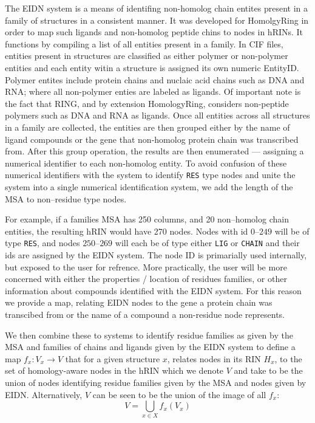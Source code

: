 The EIDN system is a means of identifing non-homolog chain entites present in a family of structures in a consistent manner. It was developed for HomolgyRing in order to map such ligands and non-homolog peptide chins to nodes in hRINs. 
It functions by compiling a list of all entities present in a family. In CIF files, entities present in structures are classified as either polymer or non-polymer entities and each entity witin a structure is assigned its own numeric EntityID. Polymer entites include protein chains and nuclaic acid chains such as DNA and RNA; where all non-polymer enties are labeled as ligands. Of important note is the fact that RING, and by extension HomologyRing, considers non-peptide polymers such as DNA and RNA as ligands. 
Once all entities across all structures in a family are collected, the entities are then grouped either by the name of ligand compounds or the gene that non-homolog protein chain was transcribed from. After this group operation, the results are then enumerated --- assigning a numerical identifier to each non-homolog entity. To avoid confusion of these numerical identifiers with the system to identify \texttt{RES} type nodes and unite the system into a single numerical identification system, we add the length of the MSA to non--residue type nodes. 

For example, if a families MSA has 250 columns, and 20 non--homolog chain entities, the resulting hRIN would have 270 nodes. Nodes with id $0$--$249$ will be of type \texttt{RES}, and nodes $250$--$269$ will each be of type either \texttt{LIG} or \texttt{CHAIN} and their ids are assigned by the EIDN system. 
The node ID is primarially used internally, but exposed to the user for refrence. More practically, the user will be more concerned with either the properties / location of residues families, or other information about compounds identified with the EIDN system. For this reason we provide a map, relating EIDN nodes to the gene a protein chain was transcibed from or the name of a compound a non-residue node represents.

We then combine these to systems to identify residue families as given by the MSA and families of chains and ligands given by the EIDN system to define a map $f_x : V_x \to V$ that for a given structure $x$, relates nodes in its RIN $H_x$, to the set of homology-aware nodes in the hRIN which we denote $V$ and take to be the union of nodes identifying residue families given by the MSA and nodes given by EIDN. Alternatively, $V$ can be seen to be the union of the image of all $f_x$: 
\begin{equation}
V = \bigcup\limits_{x \in X} f_x(V_x)
\label{eq:hRIN-V}
\end{equation}


